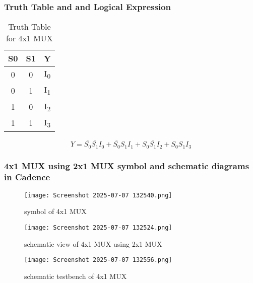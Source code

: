 \documentclass[12pt]{article}
\begin{document}
    \subsubsection{Truth Table and and Logical Expression}
    
    \begin{table}[H]
        \centering
        \caption{Truth Table for 4x1 MUX}
        \begin{tabular}{|c|c|c|}
        \hline
        \rowcolor{green!50}
        \textbf{S0} & \textbf{S1} & \textbf{Y} \\
        \hline
        0 & 0 & I\textsubscript{0} \\
        0 & 1 & I\textsubscript{1} \\
        1 & 0 & I\textsubscript{2} \\
        1 & 1 & I\textsubscript{3} \\
        \hline
        \end{tabular}
        \end{table}
   
    \[
    Y =  \overline{S_0} \overline{S_1} I_0 +\overline{S_0} S_1 I_1 + S_0 \overline{S_1} I_2 + S_0 S_1 I_3
    \]
        
    
    \subsubsection{4x1 MUX using 2x1 MUX symbol and schematic diagrams in Cadence}
       \begin{figure}[H]
           \centering
           \texttt{[image: Screenshot 2025-07-07 132540.png]}
           \caption{symbol of 4x1 MUX}
           \label{fig:enter-label}
       \end{figure}
       \begin{figure}[H]
           \centering
           \texttt{[image: Screenshot 2025-07-07 132524.png]}
           \caption{schematic view of 4x1 MUX using 2x1 MUX}
           \label{fig:enter-label}
       \end{figure}
       \begin{figure}[H]
           \centering
           \texttt{[image: Screenshot 2025-07-07 132556.png]}
           \caption{schematic testbench of 4x1 MUX}
           \label{fig:enter-label}
       \end{figure}
\end{document}
